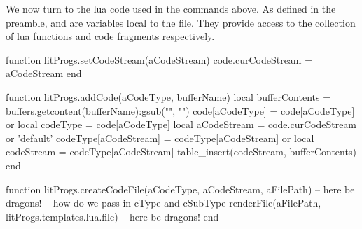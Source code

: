 \startMkIVCode
\def\defineLitProgsCreateFile#1{%
  \setvalue{create#1File}#2#3{%
    \directlua{
      thirddata.literateProgs.createCodeFile(
        '#1',
        '#2',
        '#3'
      )
    }
  }
}
\stopMkIVCode

We now turn to the lua code used in the \type{\directlua} commands above. 
As defined in the preamble,  and  are variables 
local to the  file. They provide access to the 
collection of lua functions and code fragments respectively. 

\startLuaCode
function litProgs.setCodeStream(aCodeStream)
  code.curCodeStream = aCodeStream  
end

function litProgs.addCode(aCodeType, bufferName)
  local bufferContents  =
    buffers.getcontent(bufferName):gsub("", "\n")
  code[aCodeType]       = code[aCodeType] or { }
  local codeType        = code[aCodeType]
  local aCodeStream     = code.curCodeStream or 'default'
  codeType[aCodeStream] = codeType[aCodeStream] or { }
  local codeStream      = codeType[aCodeStream]
  table_insert(codeStream, bufferContents)
end

function litProgs.createCodeFile(aCodeType,
                                 aCodeStream,
                                 aFilePath)
  -- here be dragons! -- how do we pass in cType and cSubType
  renderFile(aFilePath, litProgs.templates.lua.file)
  -- here be dragons!
end
\stopLuaCode

\stopchapter